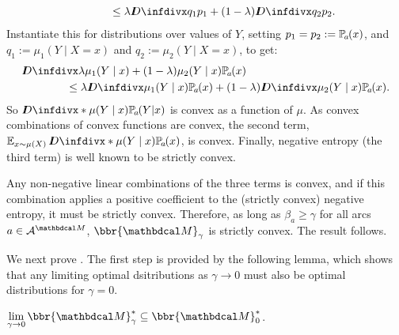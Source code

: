 \begin{subappendices}
\begin{lproof}
\begin{align*}
    \\&\qquad\qquad \leq \lambda \kldiv {q_1}{ p_1} +
                (1-\lambda) \kldiv{q_2}{p_2}.
\end{align*}
Instantiate this for distributions over values of $Y$, setting $p_1 =
 p_2 := \p_a(x)$, 
    and  $q_1 := \mu_1(Y \mid X=x)$ and
			$q_2 := \mu_2(Y\mid X=x)$, to get:
\begin{align*}
    &\kldiv{\lambda \mu_1(Y\mid x) + (1-\lambda)
		  \mu_2(Y\mid x) }{ \p_a(x) } 
    \\&\qquad\qquad \leq \lambda \kldiv
		   {\mu_1(Y\mid x)}{\p_a(x)} + (1-\lambda) \kldiv{\mu_2(Y\mid x)}{\p_a(x)}. 
\end{align*}
So $\kldiv*{\mu(Y\mid x)}{\p_a(Y|x)}$ is convex as a function of $\mu$. 
As convex combinations of convex functions are convex,
the second term, $\Ex_{x\sim\mu(X)} \kldiv*{\mu(Y\mid x)}{\p_a(x)}$, is convex.
Finally, negative entropy (the third term) is well known to be strictly convex.                

Any non-negative linear combinations of the three
terms is convex, and if this combination applies a
positive coefficient to the (strictly convex) negative entropy,
it must be strictly convex. Therefore, as
long as $\beta_a \geq \gamma$ for all arcs $a \in
\Ar^{\dg M}$, $\bbr{\dg M}_\gamma$ is
strictly convex.  The result follows.
\end{lproof}


We next prove .  The first step is provided by the
following lemma, which shows that any limiting optimal dsitributions as $\gamma \to 0$ must also be optimal distributions for $\gamma = 0$.  

\begin{lemma}\label{lem:gamma2zero}
 $\lim\limits_{\gamma\to0}\bbr{\dg M}_\gamma^* \subseteq \bbr{\dg M}_0^*$. 
\end{lemma}
\begin{lproof}\label{proof:gamma2zero}
\def\lb{k}
\def\ub{K}  


\end{lproof}
\end{subappendices}
